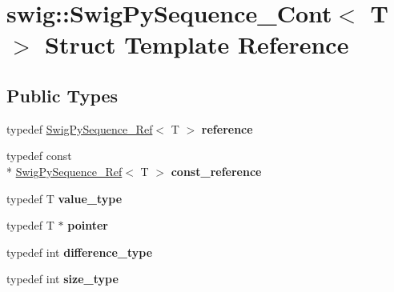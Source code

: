 \hypertarget{structswig_1_1_swig_py_sequence___cont}{\section{swig\-:\-:Swig\-Py\-Sequence\-\_\-\-Cont$<$ T $>$ Struct Template Reference}
\label{structswig_1_1_swig_py_sequence___cont}
}
\subsection*{Public Types}
\begin{DoxyCompactItemize}
\item 
\hypertarget{structswig_1_1_swig_py_sequence___cont_a4108668900abc99b72844a3a880b3638}{typedef \hyperlink{structswig_1_1_swig_py_sequence___ref}{Swig\-Py\-Sequence\-\_\-\-Ref}$<$ T $>$ {\bfseries reference}}\label{structswig_1_1_swig_py_sequence___cont_a4108668900abc99b72844a3a880b3638}

\item 
\hypertarget{structswig_1_1_swig_py_sequence___cont_a9c8d1d3acc0234f3a9cbd570ee7e9cf0}{typedef const \\*
\hyperlink{structswig_1_1_swig_py_sequence___ref}{Swig\-Py\-Sequence\-\_\-\-Ref}$<$ T $>$ {\bfseries const\-\_\-reference}}\label{structswig_1_1_swig_py_sequence___cont_a9c8d1d3acc0234f3a9cbd570ee7e9cf0}

\item 
\hypertarget{structswig_1_1_swig_py_sequence___cont_adfa84ea05a454d0a9528420256ca89d9}{typedef T {\bfseries value\-\_\-type}}\label{structswig_1_1_swig_py_sequence___cont_adfa84ea05a454d0a9528420256ca89d9}

\item 
\hypertarget{structswig_1_1_swig_py_sequence___cont_a168a126e49131e25b2616d411f71fb9a}{typedef T $\ast$ {\bfseries pointer}}\label{structswig_1_1_swig_py_sequence___cont_a168a126e49131e25b2616d411f71fb9a}

\item 
\hypertarget{structswig_1_1_swig_py_sequence___cont_a016875541fce2f04f396da8057a190f9}{typedef int {\bfseries difference\-\_\-type}}\label{structswig_1_1_swig_py_sequence___cont_a016875541fce2f04f396da8057a190f9}

\item 
\hypertarget{structswig_1_1_swig_py_sequence___cont_a53e4b21ab9cdd6d0e562ef8a0923cabb}{typedef int {\bfseries size\-\_\-type}}\label{structswig_1_1_swig_py_sequence___cont_a53e4b21ab9cdd6d0e562ef8a0923cabb}


\end{DoxyCompactItemize}
